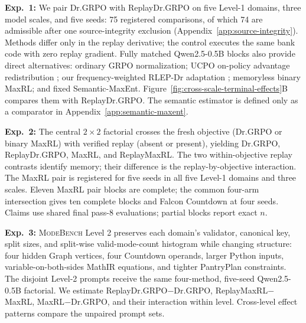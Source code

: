 \documentclass{article}
\newcommand{\1}{\mathbf 1}
\newcommand{\mb}{\textsc{ModeBench}}
\theoremstyle{remark}
\theoremstyle{definition}
\theoremstyle{plain}
\begin{document}
\label{sec:retention-design}
\noindent\textbf{Exp.~1:} We pair Dr.GRPO with ReplayDr.GRPO on five Level-1
domains, three model scales, and five seeds: 75 registered comparisons, of
which 74 are admissible after one source-integrity exclusion
(Appendix~\ref{app:source-integrity}). Methods differ only in the replay
derivative; the control executes the same bank code with zero replay gradient. Fully matched
Qwen2.5-0.5B blocks also provide direct alternatives: ordinary GRPO
normalization; UCPO on-policy advantage redistribution
\citep{lochab2026ucpo}; our frequency-weighted RLEP-Dr adaptation
\citep{zhang2025rlep}; memoryless binary MaxRL; and fixed Semantic-MaxEnt.
Figure~\ref{fig:cross-scale-terminal-effects}B compares them with
ReplayDr.GRPO. The semantic estimator is defined only as a comparator in
Appendix~\ref{app:semantic-maxent}.

\label{sec:factorial-design}
\noindent\textbf{Exp.~2:} The central \(2\times2\) factorial crosses the fresh
objective (Dr.GRPO or binary MaxRL) with verified replay (absent or present),
yielding Dr.GRPO, ReplayDr.GRPO, MaxRL, and ReplayMaxRL. The two
within-objective replay contrasts identify memory; their difference is the
replay-by-objective interaction. The MaxRL pair is registered for five seeds in
all five Level-1 domains and three scales. Eleven MaxRL pair blocks are complete;
the common four-arm intersection gives ten complete blocks and Falcon
Countdown at four seeds. Claims use shared final pass-8 evaluations; partial
blocks report exact \(n\).

\label{sec:levels-design}
\noindent\textbf{Exp.~3:} \mb{} Level 2 preserves each domain's validator,
canonical key, split sizes, and split-wise valid-mode-count histogram while
changing structure: four hidden Graph vertices, four Countdown operands,
larger Python inputs, variable-on-both-sides MathIR equations, and tighter PantryPlan
constraints. The disjoint Level-2 prompts receive the same four-method,
five-seed Qwen2.5-0.5B factorial. We estimate
ReplayDr.GRPO\(-\)Dr.GRPO, ReplayMaxRL\(-\)MaxRL,
MaxRL\(-\)Dr.GRPO, and their interaction within level. Cross-level effect
patterns compare the unpaired prompt sets.
\end{document}
